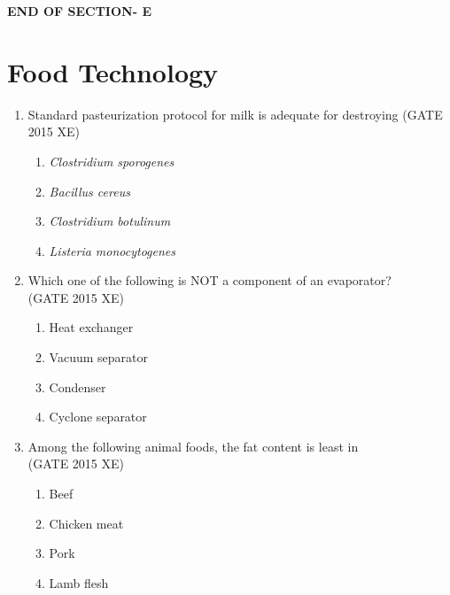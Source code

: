 \documentclass[journal,12pt,onecolumn]{IEEEtran}
\begin{document}
\vspace{2\baselineskip}
\begin{center}
    \item[\textbf{END OF SECTION- E}]
\end{center}



\newpage
\section*{Food Technology}
\bigskip
\begin{enumerate}

\item Standard pasteurization protocol for milk is adequate for destroying
\hfill{(GATE 2015 XE)} \\
\begin{multicols}{4}
\begin{enumerate}
\item \textit{Clostridium sporogenes}
\item \textit{Bacillus cereus}
\item \textit{Clostridium botulinum}
\item \textit{Listeria monocytogenes}
\end{enumerate}
\end{multicols}

\item Which one of the following is NOT a component of an evaporator?\\
\hfill{(GATE 2015 XE)} 

\begin{multicols}{4}
\begin{enumerate}
\item Heat exchanger
\item Vacuum separator
\item Condenser
\item Cyclone separator
\end{enumerate}
\end{multicols}

\item Among the following animal foods, the fat content is least in\\
\hfill{(GATE 2015 XE)} 
\begin{multicols}{4}
\begin{enumerate}
\item Beef
\item Chicken meat
\item Pork
\item Lamb flesh
\end{enumerate}
\end{multicols}


\end{enumerate}
\end{document}
